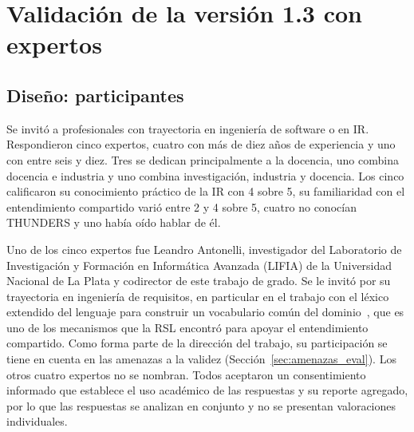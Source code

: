 \documentclass[12pt,letterpaper,oneside]{report}
\begin{document}
\section{Validación de la versión 1.3 con expertos}
\label{sec:validacion_expertos}

\subsection{Diseño: participantes}
Se invitó a profesionales con trayectoria en ingeniería de software o en IR.
Respondieron cinco expertos, cuatro con más de diez años de experiencia y uno
con entre seis y diez. Tres se dedican principalmente a la docencia, uno combina
docencia e industria y uno combina investigación, industria y docencia. Los
cinco calificaron su conocimiento práctico de la IR con 4 sobre 5, su
familiaridad con el entendimiento compartido varió entre 2 y 4 sobre 5, cuatro
no conocían THUNDERS y uno había oído hablar de él.

Uno de los cinco expertos fue Leandro Antonelli, investigador del Laboratorio de Investigación y Formación en Informática
Avanzada (LIFIA) de la Universidad Nacional de La Plata y codirector de este trabajo de grado. Se le
invitó por su trayectoria en ingeniería de requisitos, en particular en el
trabajo con el léxico extendido del lenguaje para construir un vocabulario común
del dominio~\cite{antonelli2016}, que es uno de los mecanismos que la RSL
encontró para apoyar el entendimiento compartido. Como forma parte de la
dirección del trabajo, su participación se tiene en cuenta en las amenazas a la
validez (Sección~\ref{sec:amenazas_eval}). Los otros cuatro expertos no se
nombran. Todos aceptaron un consentimiento informado que establece el uso
académico de las respuestas y su reporte agregado, por lo que las respuestas se
analizan en conjunto y no se presentan valoraciones individuales.
\end{document}

